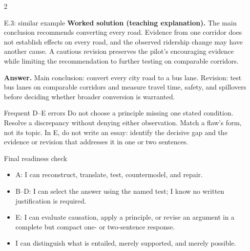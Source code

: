 \documentclass[10pt]{extarticle}
\begin{document}
\begin{multicols}{2}
\begin{workedbox}{E.3: similar example}
\textbf{Worked solution (teaching explanation).} The main conclusion recommends converting every road. Evidence from one corridor does not establish effects on every road, and the observed ridership change may have another cause. A cautious revision preserves the pilot's encouraging evidence while limiting the recommendation to further testing on comparable corridors.

\textbf{Answer.} Main conclusion: convert every city road to a bus lane. Revision: test bus lanes on comparable corridors and measure travel time, safety, and spillovers before deciding whether broader conversion is warranted.
\end{workedbox}

\begin{warningbox}{Frequent D--E errors}
Do not choose a principle missing one stated condition. Resolve a discrepancy
without denying either observation. Match a flaw's form, not its topic. In E,
do not write an essay: identify the decisive gap and the evidence or revision
that addresses it in one or two sentences.
\end{warningbox}

\begin{checklistbox}{Final readiness check}
\begin{itemize}
  \item A: I can reconstruct, translate, test, countermodel, and repair.
  \item B--D: I can select the answer using the named test; I know no written
  justification is required.
  \item E: I can evaluate causation, apply a principle, or revise an argument in
  a complete but compact one- or two-sentence response.
  \item I can distinguish what is entailed, merely supported, and merely possible.
\end{itemize}
\end{checklistbox}
\end{multicols}
\end{document}
